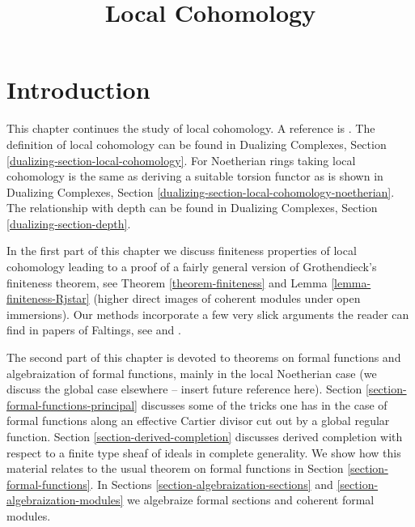 

%


\title{Local Cohomology}


\maketitle

\label{section-phantom}

\tableofcontents

\section{Introduction}
\label{section-introduction}

\noindent
This chapter continues the study of local cohomology.
A reference is \cite{SGA2}.
The definition of local cohomology can be found in
Dualizing Complexes, Section \ref{dualizing-section-local-cohomology}.
For Noetherian rings taking local cohomology is the same
as deriving a suitable torsion functor as is shown in
Dualizing Complexes, Section
\ref{dualizing-section-local-cohomology-noetherian}.
The relationship with depth can be found in
Dualizing Complexes, Section
\ref{dualizing-section-depth}.

\medskip\noindent
In the first part of this chapter we discuss finiteness properties of
local cohomology leading to a proof of a fairly general version of
Grothendieck's finiteness theorem, see Theorem \ref{theorem-finiteness}
and Lemma \ref{lemma-finiteness-Rjstar} (higher direct images
of coherent modules under open immersions).
Our methods incorporate a few very slick arguments the reader
can find in papers of Faltings, see
\cite{Faltings-annulators} and \cite{Faltings-finiteness}.

\medskip\noindent
The second part of this chapter is devoted to theorems on
formal functions and algebraization of formal functions,
mainly in the local Noetherian case (we discuss
the global case elsewhere -- insert future reference here).
Section \ref{section-formal-functions-principal}
discusses some of the tricks one has in the case
of formal functions along an effective Cartier divisor
cut out by a global regular function.
Section \ref{section-derived-completion}
discusses derived completion with respect to
a finite type sheaf of ideals in complete generality.
We show how this material relates to the usual
theorem on formal functions in Section \ref{section-formal-functions}.
In Sections \ref{section-algebraization-sections} and
\ref{section-algebraization-modules}
we algebraize formal sections and coherent formal modules.




